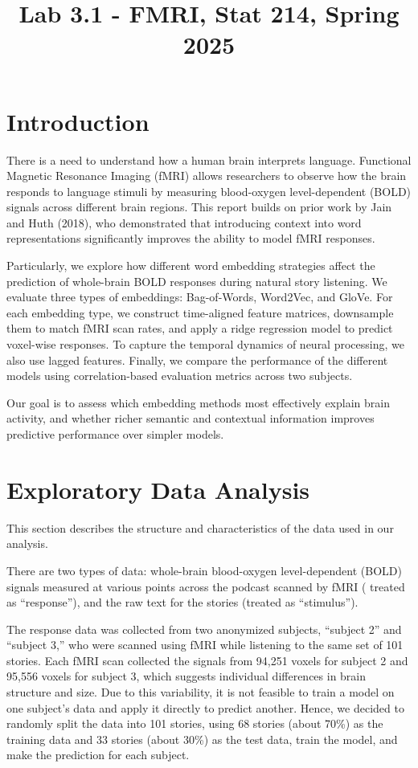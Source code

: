 \documentclass[12pt,letterpaper]{article}
\title{Lab 3.1 - FMRI, Stat 214, Spring 2025\vspace{-2em}}
\begin{document}
\maketitle


\section{Introduction}

There is a need to understand how a human brain interprets language. Functional Magnetic Resonance Imaging (fMRI) allows researchers to observe how the brain responds to language stimuli by measuring blood-oxygen level-dependent (BOLD) signals across different brain regions. This report builds on prior work by Jain and Huth (2018), who demonstrated that introducing context into word representations significantly improves the ability to model fMRI responses. 

 Particularly, we explore how different word embedding strategies affect the prediction of whole-brain BOLD responses during natural story listening. We evaluate three types of embeddings: Bag-of-Words, Word2Vec, and GloVe. For each embedding type, we construct time-aligned feature matrices, downsample them to match fMRI scan rates, and apply a ridge regression model to predict voxel-wise responses.  To capture the temporal dynamics of neural processing, we also use lagged features. Finally, we compare the performance of the different models using correlation-based evaluation metrics across two subjects. 

Our goal is to assess which embedding methods most effectively explain brain activity, and whether richer semantic and contextual information improves predictive performance over simpler models.


\section{Exploratory Data Analysis}



This section describes the structure and characteristics of the data used in our analysis. 

There are two types of data: whole-brain blood-oxygen level-dependent (BOLD) signals measured at various points across the podcast scanned by fMRI ( treated as “response”), and the raw text for the stories (treated as “stimulus”).


The response data was collected from two anonymized subjects, “subject 2” and “subject 3,” who were scanned using fMRI while listening to the same set of 101 stories. Each fMRI scan collected the signals from 94,251 voxels for subject 2 and 95,556 voxels for subject 3, which suggests individual differences in brain structure and size. Due to this variability, it is not feasible to train a model on one subject's data and apply it directly to predict another. Hence, we decided to randomly split the data into 101 stories, using 68 stories (about 70\%) as the training data and 33 stories (about 30\%) as the test data, train the model, and make the prediction for each subject. 
\end{document}
